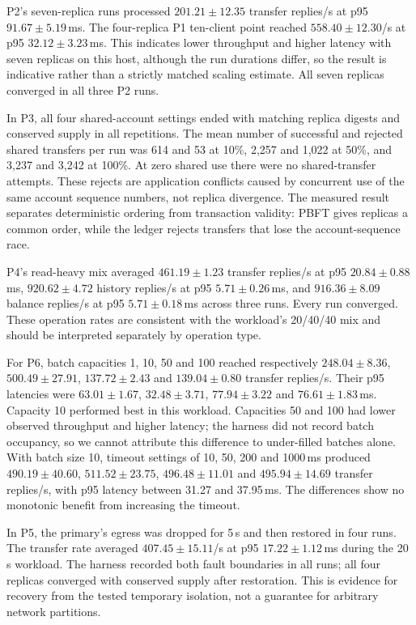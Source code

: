 \documentclass[sigconf,a4paper]{acmart}
\begin{document}
    P2's seven-replica runs processed $201.21 \pm 12.35$ transfer replies/s
    at p95 $91.67 \pm 5.19$\,ms. The four-replica P1 ten-client point reached
    $558.40 \pm 12.30$/s at p95 $32.12 \pm 3.23$\,ms. This indicates lower
    throughput and higher latency with seven replicas on this host, although
    the run durations differ, so the result is indicative rather than a
    strictly matched scaling estimate. All seven replicas converged in all
    three P2 runs.

    In P3, all four shared-account settings ended with matching replica
    digests and conserved supply in all repetitions. The mean number of
    successful and rejected shared transfers per run was 614 and 53 at 10\%,
    2,257 and 1,022 at 50\%, and 3,237 and 3,242 at 100\%. At zero shared use
    there were no shared-transfer attempts. These rejects are application
    conflicts caused by concurrent use of the same account sequence numbers,
    not replica divergence. The measured result separates deterministic
    ordering from transaction validity: PBFT gives replicas a common order,
    while the ledger rejects transfers that lose the account-sequence race.

    P4's read-heavy mix averaged $461.19 \pm 1.23$ transfer replies/s at p95
    $20.84 \pm 0.88$\,ms, $920.62 \pm 4.72$ history replies/s at p95
    $5.71 \pm 0.26$\,ms, and $916.36 \pm 8.09$ balance replies/s at p95
    $5.71 \pm 0.18$\,ms across three runs. Every run converged. These operation rates
    are consistent with the workload's 20/40/40 mix and should be interpreted
    separately by operation type.

    For P6, batch capacities 1, 10, 50 and 100 reached respectively
    $248.04 \pm 8.36$, $500.49 \pm 27.91$, $137.72 \pm 2.43$ and
    $139.04 \pm 0.80$ transfer replies/s. Their p95 latencies were
    $63.01 \pm 1.67$, $32.48 \pm 3.71$, $77.94 \pm 3.22$ and
    $76.61 \pm 1.83$\,ms. Capacity 10 performed best in this workload.
    Capacities 50 and 100 had lower observed throughput and higher latency;
    the harness did not record batch occupancy, so we cannot attribute this
    difference to under-filled batches alone. With batch size 10, timeout
    settings of 10, 50, 200 and 1000\,ms produced $490.19 \pm 40.60$,
    $511.52 \pm 23.75$, $496.48 \pm 11.01$ and $495.94 \pm 14.69$
    transfer replies/s, with p95 latency between 31.27 and 37.95\,ms. The
    differences show no monotonic benefit from increasing the timeout.

    In P5, the primary's egress was dropped for 5\,s and then restored in four
    runs. The transfer rate averaged $407.45 \pm 15.11$/s at p95
    $17.22 \pm 1.12$\,ms during the 20\,s workload. The harness recorded both
    fault boundaries in all runs; all four replicas converged with conserved
    supply after restoration. This is evidence for recovery from the tested
    temporary isolation, not a guarantee for arbitrary network partitions.
\end{document}
